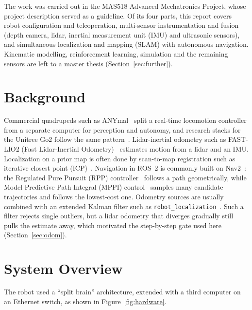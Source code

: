 \documentclass[11pt,a4paper]{article}
\begin{document}
The work was carried out in the MAS518 Advanced Mechatronics Project, whose project description served
as a guideline. Of its four parts, this report covers robot configuration and teleoperation,
multi-sensor instrumentation and fusion (depth camera, lidar, inertial measurement unit (IMU) and
ultrasonic sensors), and simultaneous localization and mapping (SLAM) with autonomous navigation.
Kinematic modelling, reinforcement learning, simulation and the remaining sensors are left to a master thesis
(Section~\ref{sec:further}).

\section{Background}

Commercial quadrupeds such as ANYmal~\cite{anymal} split a real-time locomotion controller from a
separate computer for perception and autonomy, and research stacks for the Unitree Go2 follow the same
pattern~\cite{cmu}. Lidar-inertial odometry such as
FAST-LIO2 (Fast Lidar-Inertial Odometry)~\cite{fastlio2} estimates motion from a lidar and an IMU.
Localization on a prior map is often done by scan-to-map registration such as iterative closest point
(ICP)~\cite{icp}. Navigation in ROS~2 is commonly built on Nav2~\cite{nav2}: the Regulated Pure Pursuit
(RPP) controller~\cite{rpp} follows a path geometrically, while Model Predictive Path Integral (MPPI)
control~\cite{mppi} samples many candidate trajectories and follows the lowest-cost one. Odometry sources
are usually combined with an extended Kalman filter such as \texttt{robot\_localization}~\cite{robotloc}.
Such a filter rejects single outliers, but a lidar odometry that diverges gradually still pulls the
estimate away, which motivated the step-by-step gate used here (Section~\ref{sec:odom}).

\section{System Overview}

The robot used a ``split brain'' architecture, extended with a third computer on an Ethernet switch, as
shown in Figure~\ref{fig:hardware}.
\end{document}
